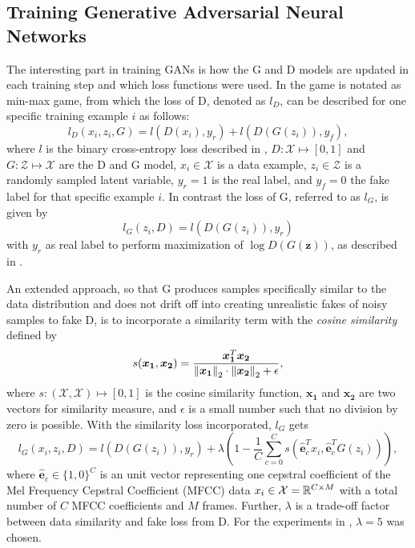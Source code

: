 \subsection{Training Generative Adversarial Neural Networks}\label{sec:nn_adv_train}
The interesting part in training GANs is how the G and D models are updated in each training step and which loss functions were used.
In  the game is notated as min-max game, from which the loss of D, denoted as $l_D$, can be described for one specific training example $i$ as follows:
\begin{equation}
  l_D(x_i, z_i, G) = l(D(x_i), y_r) + l(D(G(z_i)), y_f),
\end{equation}
where $l$ is the binary cross-entropy loss described in , $D: \mathcal{X} \mapsto [0, 1]$ and $G: \mathcal{Z} \mapsto \mathcal{X}$ are the D and G model, $x_i \in \mathcal{X}$ is a data example, $z_i \in \mathcal{Z}$ is a randomly sampled latent variable, $y_r = 1$ is the real label, and $y_f = 0$ the fake label for that specific example $i$.
In contrast the loss of G, referred to as $l_G$, is given by
\begin{equation}
  l_G(z_i, D) =  l(D(G(z_i)), y_r)
\end{equation}
with $y_r$ as real label to perform maximization of $\log D(G(\bm{z}))$, as described in .

An extended approach, so that G produces samples specifically similar to the data distribution and does not drift off into creating unrealistic fakes of noisy samples to fake D, is to incorporate a similarity term with the \emph{cosine similarity} defined by
\begin{equation}
  s(\bm{x_1}, \bm{x_2}) = \frac{\bm{x_1}^T \bm{x_2}}{\norm{\bm{x_1}}_2 \cdot \norm{\bm{x_2}}_2 + \epsilon},
\end{equation}
where $s : (\mathcal{X}, \mathcal{X}) \mapsto [0, 1]$ is the cosine similarity function, $\bm{x_1}$ and $\bm{x_2}$ are two vectors for similarity measure, and $\epsilon$ is a small number such that no division by zero is possible.
With the similarity loss incorporated, $l_G$ gets
\begin{equation}
  l_G(x_i, z_i, D) =  l(D(G(z_i)), y_r) + \lambda \left(1 - \frac{1}{C} \sum_{c=0}^{C} s(\hat{\bm{e}}_c^T x_i , \hat{\bm{e}}_c^T G(z_i)) \right),
\end{equation}
where $\hat{\bm{e}}_c \in \{1, 0\}^C$ is an unit vector representing one cepstral coefficient of the Mel Frequency Cepstral Coefficient (MFCC) data $x_i \in \mathcal{X} = \mathbb{R}^{C \times M}$ with a total number of $C$ MFCC coefficients and $M$ frames.
Further, $\lambda$ is a trade-off factor between data similarity and fake loss from D.
For the experiments in , $\lambda = 5$ was chosen.

